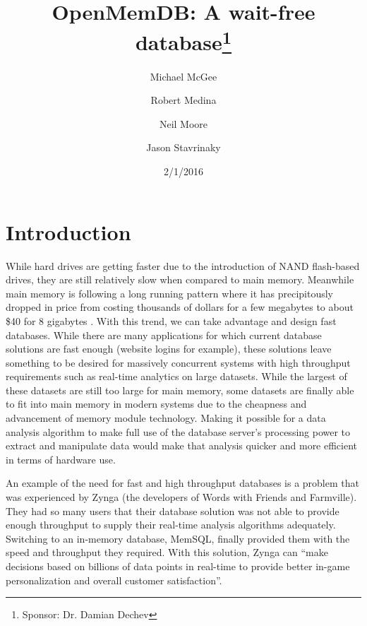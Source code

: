 \documentclass[letter,11pt]{article}
\title{OpenMemDB: A wait-free database\thanks{Sponsor: Dr. Damian Dechev}}
\author{Michael McGee \and Robert Medina \and Neil Moore \and Jason Stavrinaky}
\date{2/1/2016}
\begin{document}
\maketitle
\newpage


\section{Introduction}
While hard drives are getting faster due to the introduction of NAND flash-based drives,
they are still relatively slow when compared to main memory. Meanwhile main memory is following a long running 
pattern where it has precipitously dropped in price from costing thousands of dollars for a few 
megabytes to about \$40 for 8 gigabytes \cite{jcmit}. With this trend, we can take 
advantage and design fast databases. While there are many applications for 
which current database solutions are fast enough (website logins for example), these 
solutions leave something to be desired for massively concurrent systems with high throughput
requirements such as real-time analytics on large datasets. While the largest of 
these datasets are still too large for main memory, some datasets are finally able
to fit into main memory in modern systems due to the cheapness and advancement of 
memory module technology. Making it possible for a data analysis algorithm to make 
full use of the database server's processing power to extract and manipulate data
would make that analysis quicker and more efficient in terms of hardware use.
\par\vspace{\baselineskip}
An example of the need for fast and high throughput databases is a problem that was experienced by Zynga 
(the developers of Words with Friends and Farmville). They had so many users that their database solution was
not able to provide enough throughput to supply their real-time analysis algorithms adequately. Switching to an
in-memory database, MemSQL, finally provided them with the speed and throughput they required. With this 
solution, Zynga can ``make decisions based on billions of data points in real-time to 
provide better in-game personalization and overall customer satisfaction''\cite{MemSQL}.
\end{document}
